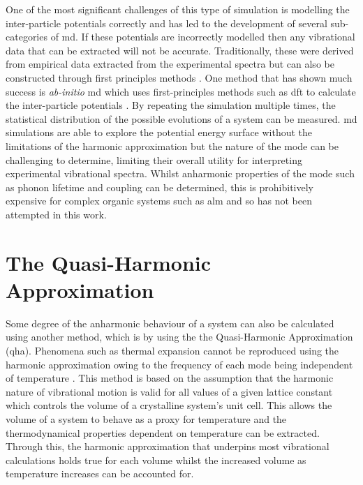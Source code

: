 One of the most significant challenges of this type of simulation is modelling the inter\nobreakdash-particle potentials correctly and has led to the development of several sub\nobreakdash-categories of \acrshort{md}. If these potentials are incorrectly modelled then any vibrational data that can be extracted will not be accurate. Traditionally, these were derived from empirical data extracted from the experimental spectra \cite{Thakur1998, Haas1995, Miller2004} but can also be constructed through first principles methods  \cite{Wang2020}. One method that has shown much success is \textit{ab\nobreakdash-initio} \acrshort{md} \cite{Car2005} which uses first\nobreakdash-principles methods such as \acrshort{dft} to calculate the inter\nobreakdash-particle potentials \cite{Gai1998}. By repeating the simulation multiple times, the statistical distribution of the possible evolutions of a system can be measured. \acrshort{md} simulations are able to explore the potential energy surface without the limitations of the harmonic approximation but the nature of the mode can be challenging to determine, limiting their overall utility for interpreting experimental vibrational spectra. Whilst anharmonic properties of the mode such as phonon lifetime and coupling can be determined, this is prohibitively expensive for complex organic systems such as \acrshort{alm} and so has not been attempted in this work.

\section{The Quasi-Harmonic Approximation}
 Some degree of the anharmonic behaviour of a system can also be calculated using another method, which is by using the the Quasi\nobreakdash-Harmonic Approximation (\acrshort{qha}). Phenomena such as thermal expansion cannot be reproduced using the harmonic approximation owing to the frequency of each mode being independent of temperature \cite{yatsyshyn2015handbook}. This method is based on the assumption that the harmonic nature of vibrational motion is valid for all values of a given lattice constant which controls the volume of a crystalline system's unit cell. This allows the volume of a system to behave as a proxy for temperature and the thermodynamical properties dependent on temperature can be extracted. Through this, the harmonic approximation that underpins most vibrational calculations holds true for each volume whilst the increased volume as temperature increases can be accounted for. 

